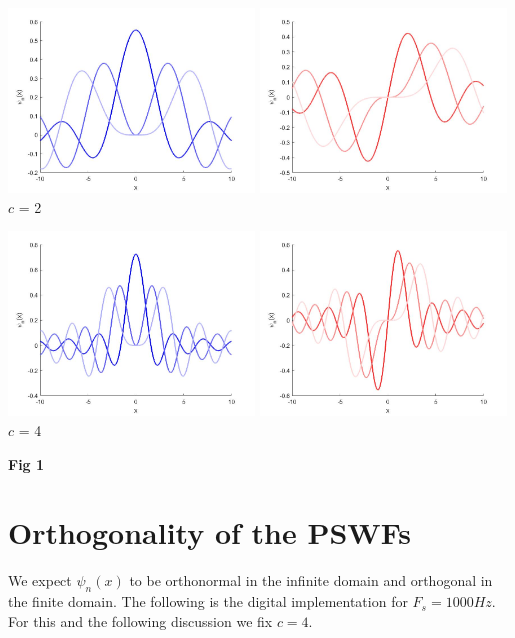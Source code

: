 \documentclass[a4paper,10pt]{article}
\begin{document}
\begin{center}
\includegraphics[width=0.49\textwidth]{"c2_e.jpg"}
\includegraphics[width=0.49\textwidth]{"c2_o.jpg"}
\small{$c$ = 2}

\includegraphics[width=0.49\textwidth]{"c4_e.jpg"}
\includegraphics[width=0.49\textwidth]{"c4_o.jpg"}
\small{$c$ = 4}

\textbf{Fig 1}
\end{center}

\section{Orthogonality of the PSWFs}
We expect $\psi_n(x)$ to be orthonormal in the infinite domain and orthogonal in the finite domain. The following is the digital implementation for $F_s = 1000 Hz$. For this and the following discussion we fix $c=4$.
\end{document}
